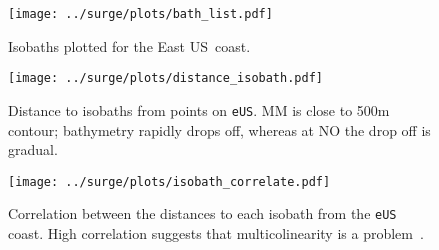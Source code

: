 
\begin{figure}[htb!]
\texttt{[image: ../surge/plots/bath\_list.pdf]}
\vspace{-25pt}

\caption{Isobaths plotted for the East US~coast.}
\label{fig:bath}
\texttt{[image: ../surge/plots/distance\_isobath.pdf]}
\vspace{-25pt}

\caption{Distance to isobaths from points on \texttt{eUS}. MM is close to 500m
contour; bathymetry rapidly drops off, whereas at NO the drop off is gradual.}
\label{fig:isobath}
\texttt{[image: ../surge/plots/isobath\_correlate.pdf]}
\vspace{-25pt}

\caption{Correlation between the distances to each isobath from
the \texttt{eUS} coast. High correlation
suggests that multicolinearity is a problem~\cite{faul2019concise}.}
\label{fig:isobath}
\end{figure}
